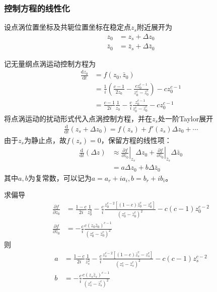\subsubsection{控制方程的线性化}
设点涡位置坐标及共轭位置坐标在稳定点$z_{s}$附近展开为
\begin{align*}
    z_{0}&=z_{s}+\Delta z_{0}\\
    \bar{z}_{0}&=\bar{z}_{s}+\Delta \bar{z}_{0}
\end{align*}

记无量纲点涡运动控制方程为
\begin{align*}
    \frac{\mathrm{d}{z}_{0}}{\mathrm{d}{t}} &=f(z_{0},\bar{z}_{0})\\
    &=\frac{1}{i} \left( \frac{c-1}{2{z}_0} - \frac{c{z}_0^{c-1}}{{z}_0^c - \bar{{z}}_0^c} \right) - c {z}_0^{c-1}\\
    &=\frac{c-1}{2i}\frac{1}{z_{0}}-\frac{c}{i}\frac{z_{0}^{c-1}}{z_{0}^{c}-\bar{z}_{0}^{c}}-cz_{0}^{c-1}
\end{align*}
将点涡运动的扰动形式代入点涡控制方程，并在$z_{s}$处一阶Taylor展开
\begin{align*}
    \frac{\mathrm{d}}{\mathrm{d}t}(z_{s}+\Delta z_{0})=f(z_{s})+f'(z_{s})\Delta z_{0}+\cdots
\end{align*}
由于$z_{s}$为静止点，故$f(z_{s})=0$，保留方程的线性项：
\begin{align*}
    \frac{\mathrm{d}}{\mathrm{d}t}(\Delta z)&\approx \left.\frac{\partial f}{\partial z_{0}}\right|_{z_{s}}\Delta z_{0}+\left.\frac{\partial f}{\partial \bar{z}_{0}}\right|_{\bar{z}_{s}}\Delta \bar{z}_{0}\\
    &=a\Delta z_{0}+b\Delta \bar{z}_{0}
\end{align*}
其中$a,b$为复常数，可以记为$a=a_{r}+ia_{i},b=b_{r}+ib_{i}$。

求偏导
\begin{align*}
    \frac{\partial f}{\partial z_{0}}&=\frac{1-c}{2i}\frac{1}{z_{0}^{2}}-\frac{c}{i}\frac{z_{0}^{c-2}[(1-c)\bar{z}_{0}^{c}-z_{0}^{c}]}{(z_{0}^{c}-\bar{z}_{0}^{c})^{2}}-c(c-1)z_{0}^{c-2}\\
    \frac{\partial f}{\partial \bar{z}_{0}}&=-\frac{c}{i}\frac{c(z_{0}\bar{z}_{0})^{c-1}}{(z_{0}^{c}-\bar{z}_{0}^{c})^{2}}
\end{align*}
则
\begin{align*}
    a&=\frac{1-c}{2i}\frac{1}{z_{s}^{2}}-\frac{c}{i}\frac{z_{s}^{c-2}[(1-c)\bar{z}_{s}^{c}-z_{s}^{c}]}{(z_{s}^{c}-\bar{z}_{s}^{c})^{2}}-c(c-1)z_{s}^{c-2}\\
    b&=-\frac{c}{i}\frac{c(z_{s}\bar{z}_{s})^{c-1}}{(z_{s}^{c}-\bar{z}_{s}^{c})^{2}}
\end{align*}

